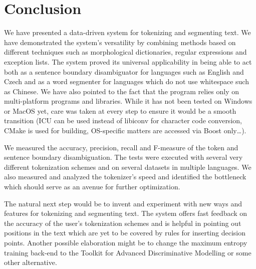 \section{Conclusion}

We have presented a data-driven system for tokenizing and segmenting text. We
have demonstrated the system's versatility by combining methods based on
different techniques such as morphological dictionaries, regular expressions
and exception lists. The system proved its universal applicability in being
able to act both as a sentence boundary disambiguator for languages such as
English and Czech and as a word segmenter for languages which do not use
whitespace such as Chinese. We have also pointed to the fact that the program
relies only on multi-platform programs and libraries. While it has not been
tested on Windows or MacOS yet, care was taken at every step to ensure it would
be a smooth transition (ICU can be used instead of libiconv for character code
conversion, CMake is used for building, OS-specific matters are accessed via
Boost only\ldots).

We measured the accuracy, precision, recall and F-measure of the token and
sentence boundary disambiguation. The tests were executed with several very
different tokenization schemes and on several datasets in multiple languages.
We also measured and analyzed the tokenizer's speed and identified the
bottleneck which should serve as an avenue for further optimization.

The natural next step would be to invent and experiment with new ways and
features for tokenizing and segmenting text. The system offers fast feedback on
the accuracy of the user's tokenization schemes and is helpful in pointing out
positions in the text which are yet to be covered by rules for inserting
decision points. Another possible elaboration might be to change the maximum
entropy training back-end to the Toolkit for Advanced Discriminative Modelling
or some other alternative.
